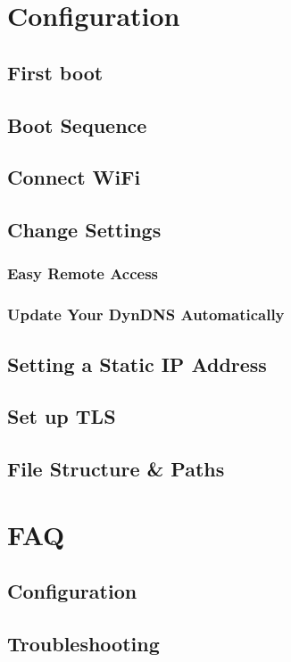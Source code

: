 \documentclass{article}
\begin{document}
\section{Configuration}
\subsection{First boot}

\subsection{Boot Sequence}

\subsection{Connect WiFi}

\subsection{Change Settings}
\subsubsection{Easy Remote Access}

\subsubsection{Update Your DynDNS Automatically}

\subsection{Setting a Static IP Address} \label{Static IP}

\subsection{Set up TLS} \label{Set up TLS}


\subsection{File Structure \& Paths}



\section{FAQ}
\subsection{Configuration}


\subsection{Troubleshooting}

\end{document}
